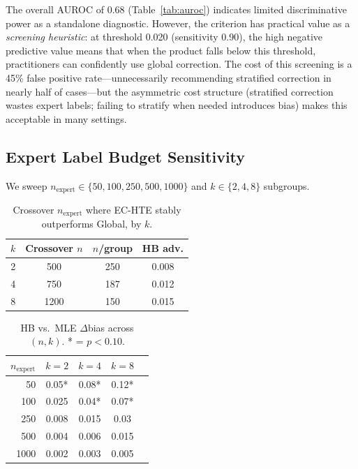 \documentclass[11pt,a4paper]{article}
\begin{document}
The overall AUROC of 0.68 (Table~\ref{tab:auroc}) indicates limited discriminative power as a standalone diagnostic. However, the criterion has practical value as a \emph{screening heuristic}: at threshold 0.020 (sensitivity 0.90), the high negative predictive value means that when the product falls below this threshold, practitioners can confidently use global correction. The cost of this screening is a 45\% false positive rate---unnecessarily recommending stratified correction in nearly half of cases---but the asymmetric cost structure (stratified correction wastes expert labels; failing to stratify when needed introduces bias) makes this acceptable in many settings.

\subsection{Expert Label Budget Sensitivity}
\label{sec:budget}

We sweep $n_{\text{expert}} \in \{50, 100, 250, 500, 1000\}$ and $k \in \{2, 4, 8\}$ subgroups.

\begin{table}[t]
\centering
\small
\caption{Crossover $n_{\text{expert}}$ where EC-HTE stably outperforms Global, by $k$.}
\label{tab:crossover}
\begin{tabular}{@{}cccc@{}}
\toprule
$k$ & Crossover $n$ & $n$/group & HB adv. \\
\midrule
2 & 500 & 250 & 0.008 \\
4 & 750 & 187 & 0.012 \\
8 & 1200 & 150 & 0.015 \\
\bottomrule
\end{tabular}
\end{table}

\begin{table}[t]
\centering
\small
\caption{HB vs.\ MLE $\Delta$bias across $(n, k)$. * = $p < 0.10$.}
\label{tab:budget}
\begin{tabular}{@{}rcccc@{}}
\toprule
$n_{\text{expert}}$ & $k{=}2$ & $k{=}4$ & $k{=}8$ \\
\midrule
50 & 0.05* & 0.08* & 0.12* \\
100 & 0.025 & 0.04* & 0.07* \\
250 & 0.008 & 0.015 & 0.03 \\
500 & 0.004 & 0.006 & 0.015 \\
1000 & 0.002 & 0.003 & 0.005 \\
\bottomrule
\end{tabular}
\end{table}
\end{document}
